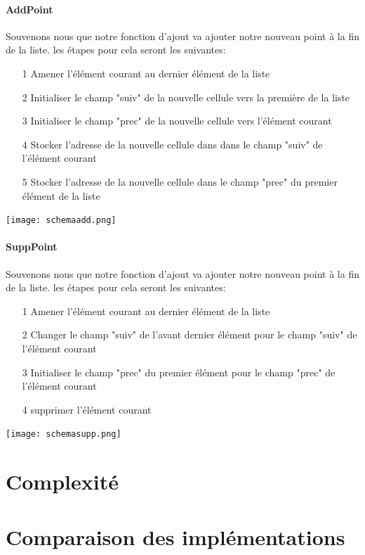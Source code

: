 \documentclass[a4paper, 11pt, oneside]{article}
\begin{document}
\paragraph{AddPoint}
\smallskip

Souvenons nous que notre fonction d'ajout va ajouter notre nouveau point à la fin de la liste. les étapes pour cela seront les suivantes:
\begin{itemize}
    \item[1] Amener l'élément courant au dernier élément de  la liste
    \item[2] Initialiser le champ "suiv" de la nouvelle cellule vers la première de la liste
    \item[3] Initialiser le champ "prec" de la nouvelle cellule vers l'élément courant
    \item[4] Stocker l'adresse de la nouvelle cellule dans dans le champ "suiv" de l'élément courant
    \item[5] Stocker l'adresse de la nouvelle cellule dans le champ "prec" du premier élément de la liste
\end{itemize}

\texttt{[image: schemaadd.png]}


\paragraph{SuppPoint}
\smallskip

Souvenons nous que notre fonction d'ajout va ajouter notre nouveau point à la fin de la liste. les étapes pour cela seront les suivantes:
\begin{itemize}
    \item[1] Amener l'élément courant au dernier élément de  la liste
    \item[2] Changer le champ "suiv" de l'avant dernier élément pour le champ "suiv" de l'élément courant
    \item[3] Initialiser le champ "prec" du premier élément pour le champ "prec" de l'élément courant
    \item[4] supprimer l'élément courant
\end{itemize}




\texttt{[image: schemasupp.png]}

\section{Complexité}



\section{Comparaison des implémentations}
\end{document}
